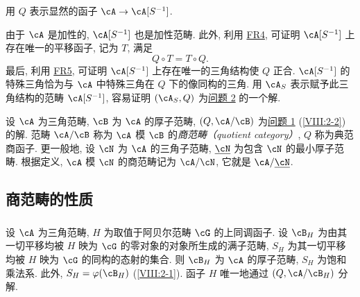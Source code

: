 用 $Q$ 表示显然的函子 $\cA\to \cA[S^{-1}]$.

由于 $\cA$ 是加性的, $\cA[S^{-1}]$ 也是加性范畴. 此外, 利用 \hyperlink{VIII:FR4}{FR4}, 可证明 $\cA[S^{-1}]$ 上存在唯一的平移函子, 记为 $T$, 满足
\[
  Q\circ T = T\circ Q \text{.}
\]
最后, 利用 \hyperlink{VIII:FR5}{FR5}, 可证明 $\cA[S^{-1}]$ 上存在唯一的三角结构使 $Q$ 正合. $\cA[S^{-1}]$ 的特殊三角恰为与 $\cA$ 中特殊三角在 $Q$ 下的像同构的三角. 用 $\cA_S$ 表示赋予此三角结构的范畴 $\cA[S^{-1}]$, 容易证明 $(\cA_S,Q)$ 为\hyperlink{VIII:prob2}{问题 2} 的一个解.

\begin{definition}\label{VIII:2-3-3}
设 $\cA$ 为三角范畴, $\cB$ 为 $\cA$ 的厚子范畴, $(Q,\cA/\cB)$ 为\hyperlink{VIII:prob1}{问题 1} (\ref{VIII:2-2}) 的解. 范畴 $\cA/\cB$ 称为 $\cA$ 模 $\cB$ 的\emph{商范畴（quotient category）}, $Q$ 称为典范商函子. 更一般地, 设 $\cN$ 为 $\cA$ 的三角子范畴, $\underline\cN$ 为包含 $\cN$ 的最小厚子范畴. 根据定义, $\cA$ 模 $\cN$ 的商范畴记为 $\cA/\cN$, 它就是 $\cA/\underline\cN$.
\end{definition}

\subsection{商范畴的性质}\label{VIII:2-4}

\subsubsection{}\label{VIII:2-4-1}

设 $\cA$ 为三角范畴, $H$ 为取值于阿贝尔范畴 $\cG$ 的上同调函子. 设 $\cB_H$ 为由其一切平移均被 $H$ 映为 $\cG$ 的零对象的对象所生成的满子范畴, $S_H$ 为其一切平移均被 $H$ 映为 $\cG$ 的同构的态射的集合. 则 $\cB_H$ 为 $\cA$ 的厚子范畴, $S_H$ 为饱和乘法系. 此外, $S_H=\varphi(\cB_H)$ (\ref{VIII:2-1}). 函子 $H$ 唯一地通过 $(Q,\cA/\cB_H)$ 分解.

